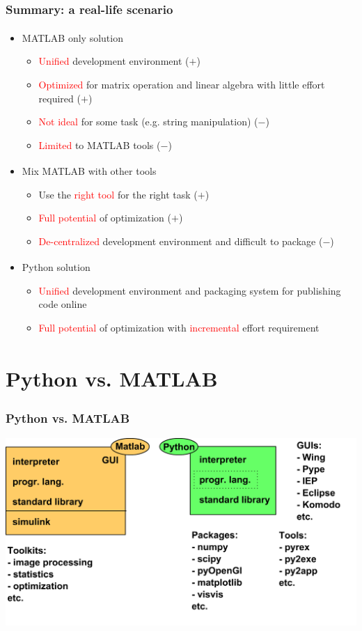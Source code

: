 \documentclass[compress]{beamer}
\begin{document}
\begin{frame}
	\frametitle{Summary: a real-life scenario}
	\begin{itemize}
		\item MATLAB\textsuperscript{\textregistered} only solution
		\begin{itemize}
			\item \textcolor{red}{Unified} development environment ($+$)
			\item \textcolor{red}{Optimized} for matrix operation and linear algebra with little effort required ($+$)
			\item \textcolor{red}{Not ideal} for some task (e.g. string manipulation) ($-$)
			\item \textcolor{red}{Limited} to MATLAB tools ($-$)
		\end{itemize}
		\item Mix MATLAB\textsuperscript{\textregistered} with other tools
		\begin{itemize}
			\item Use the \textcolor{red}{right tool} for the right task ($+$)
			\item \textcolor{red}{Full potential} of optimization ($+$)
			\item \textcolor{red}{De-centralized} development environment and difficult to package ($-$)
		\end{itemize}
		\item Python\textsuperscript{\texttrademark} solution
		\begin{itemize}
			\item \textcolor{red}{Unified} development environment and packaging system for publishing code online
			\item \textcolor{red}{Full potential} of optimization with \textcolor{red}{incremental} effort requirement
		\end{itemize}
	\end{itemize}
\end{frame}

\section{Python\textsuperscript{\texttrademark} vs. MATLAB \textsuperscript{\textregistered}}
\begin{frame}
	\frametitle{Python\textsuperscript{\texttrademark} vs. MATLAB \textsuperscript{\textregistered}}
	\centering
	\includegraphics[width=\textwidth]{fig/pythonVSmatlab}
\end{frame}
\end{document}
